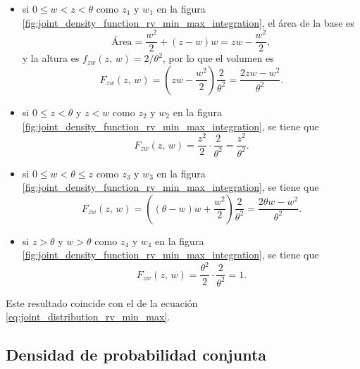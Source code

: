 \documentclass[a4paper]{report}
\begin{document}
\begin{itemize}
 \item si \(0\leq w<z<\theta\) como \(z_1\) y \(w_1\) en la figura \ref{fig:joint_density_function_rv_min_max_integration}, el área de la base es
 \[
  \textrm{Área}=\frac{w^2}{2}+(z-w)w=zw-\frac{w^2}{2},
 \]
y la altura es \(f_{zw}(z,\,w)=2/\theta^2\), por lo que el volumen es
\[
 F_{zw}(z,\,w)=\left(zw-\frac{w^2}{2}\right)\frac{2}{\theta^2}=\frac{2zw-w^2}{\theta^2}.
\]
\item si \(0\leq z<\theta\) y \(z<w\) como \(z_2\) y \(w_2\) en la figura \ref{fig:joint_density_function_rv_min_max_integration}, se tiene que
\[
 F_{zw}(z,\,w)=\frac{z^2}{2}\cdot\frac{2}{\theta^2}=\frac{z^2}{\theta^2}.
\]
\item si \(0\leq w<\theta\leq z\) como \(z_3\) y \(w_3\) en la figura \ref{fig:joint_density_function_rv_min_max_integration}, se tiene que
\[
 F_{zw}(z,\,w)=\left((\theta-w)w+\frac{w^2}{2}\right)\frac{2}{\theta^2}=\frac{2\theta w-w^2}{\theta^2}.
\]
\item si \(z>\theta\) y \(w>\theta\) como \(z_4\) y \(w_4\) en la figura \ref{fig:joint_density_function_rv_min_max_integration}, se tiene que
\[
 F_{zw}(z,\,w)=\frac{\theta^2}{2}\cdot\frac{2}{\theta^2}=1.
\]
\end{itemize}
Este resultado coincide con el de la ecuación \ref{eq:joint_distribution_rv_min_max}.

\subsection{Densidad de probabilidad conjunta}
\end{document}
